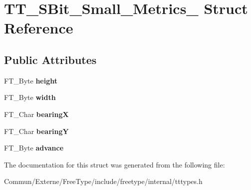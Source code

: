 \hypertarget{struct_t_t___s_bit___small___metrics__}{}\section{T\+T\+\_\+\+S\+Bit\+\_\+\+Small\+\_\+\+Metrics\+\_\+ Struct Reference}
\label{struct_t_t___s_bit___small___metrics__}
\subsection*{Public Attributes}
\begin{DoxyCompactItemize}
\item 
F\+T\+\_\+\+Byte {\bfseries height}\hypertarget{struct_t_t___s_bit___small___metrics___aecc44b5e504d5ce27521505ed53420c8}{}\label{struct_t_t___s_bit___small___metrics___aecc44b5e504d5ce27521505ed53420c8}

\item 
F\+T\+\_\+\+Byte {\bfseries width}\hypertarget{struct_t_t___s_bit___small___metrics___ad2401ae208b1663d0085ca06a04885fe}{}\label{struct_t_t___s_bit___small___metrics___ad2401ae208b1663d0085ca06a04885fe}

\item 
F\+T\+\_\+\+Char {\bfseries bearingX}\hypertarget{struct_t_t___s_bit___small___metrics___a4361ae83a66706852c0c7d4c4ddff9c2}{}\label{struct_t_t___s_bit___small___metrics___a4361ae83a66706852c0c7d4c4ddff9c2}

\item 
F\+T\+\_\+\+Char {\bfseries bearingY}\hypertarget{struct_t_t___s_bit___small___metrics___aba8cbfd6203f4083b8fb305f88d6d1fc}{}\label{struct_t_t___s_bit___small___metrics___aba8cbfd6203f4083b8fb305f88d6d1fc}

\item 
F\+T\+\_\+\+Byte {\bfseries advance}\hypertarget{struct_t_t___s_bit___small___metrics___a056c5ea71ec3339ca9b7356ea7c90e37}{}\label{struct_t_t___s_bit___small___metrics___a056c5ea71ec3339ca9b7356ea7c90e37}

\end{DoxyCompactItemize}


The documentation for this struct was generated from the following file\+:\begin{DoxyCompactItemize}
\item 
Commun/\+Externe/\+Free\+Type/include/freetype/internal/tttypes.\+h\end{DoxyCompactItemize}

